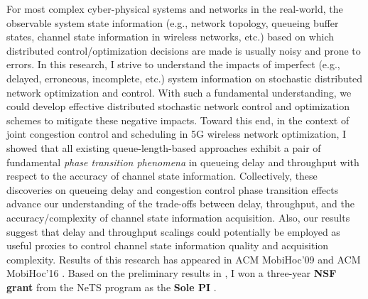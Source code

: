 \documentclass[10pt]{article}
\theoremstyle{plain} \numberwithin{equation}{section}
\theoremstyle{definition}
\begin{document}
For most complex cyber-physical systems and networks in the real-world, the observable system state information (e.g., network topology, queueing buffer states, channel state information in wireless networks, etc.) based on which distributed control/optimization decisions are made is usually noisy and prone to errors.
In this research, I strive to understand the impacts of imperfect (e.g., delayed, erroneous, incomplete, etc.) system information on stochastic distributed network optimization and control.
With such a fundamental understanding, we could develop effective distributed stochastic network control and optimization schemes to mitigate these negative impacts.
Toward this end, in the context of joint congestion control and scheduling in 5G wireless network optimization, I showed that all existing queue-length-based approaches exhibit a pair of fundamental {\em phase transition phenomena} in queueing delay and throughput with respect to the accuracy of channel state information.
Collectively, these discoveries on queueing delay and congestion control phase transition effects advance our understanding of the trade-offs between delay, throughput, and the accuracy/complexity of channel state information acquisition. 
Also, our results suggest that delay and throughput scalings could potentially be employed as useful proxies to control channel state information quality and acquisition complexity.
Results of this research has appeared in ACM MobiHoc'09 \cite{Liu09:MC_MIMO_Mobihoc} and ACM MobiHoc'16 \cite{Liu16:M-MIMO}.
Based on the preliminary results in \cite{Liu09:MC_MIMO_Mobihoc,Liu16:M-MIMO}, I won a three-year {\bf NSF grant} from the NeTS program as the {\bf Sole PI} \cite{Liu15:NeTS_Grant}. 
\end{document}
